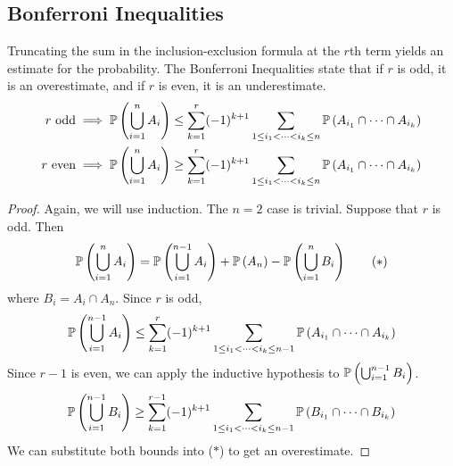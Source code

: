 \documentclass{article}
\begin{document}
\subsection{Bonferroni Inequalities}
Truncating the sum in the inclusion-exclusion formula at the $r$th term yields an estimate for the probability. The Bonferroni Inequalities state that if $r$ is odd, it is an overestimate, and if $r$ is even, it is an underestimate.
\begin{align*}
	r \text{ odd}  & \implies \mathbb{P}\left({\bigcup_{i=1}^n A_i}\right) \leq \sum_{k=1}^r (-1)^{k+1} \sum_{1 \leq i_1 < \dots < i_k \leq n} \mathbb{P}\left({A_{i_1} \cap \dots \cap A_{i_k}}\right) \\
	r \text{ even} & \implies \mathbb{P}\left({\bigcup_{i=1}^n A_i}\right) \geq \sum_{k=1}^r (-1)^{k+1} \sum_{1 \leq i_1 < \dots < i_k \leq n} \mathbb{P}\left({A_{i_1} \cap \dots \cap A_{i_k}}\right)
\end{align*}
\begin{proof}
	Again, we will use induction. The $n=2$ case is trivial. Suppose that $r$ is odd. Then
	\begin{equation}
		\mathbb{P}\left({\bigcup_{i=1}^n A_i}\right) = \mathbb{P}\left({\bigcup_{i=1}^{n-1} A_i}\right) + \mathbb{P}\left({A_n}\right) - \mathbb{P}\left({\bigcup_{i=1}^n B_i}\right) \tag{$\ast$}
	\end{equation}
	where $B_i = A_i \cap A_n$. Since $r$ is odd,
	\[ \mathbb{P}\left({\bigcup_{i=1}^{n-1} A_i}\right) \leq \sum_{k=1}^r (-1)^{k+1} \sum_{1 \leq i_1 < \dots < i_k \leq n-1} \mathbb{P}\left({A_{i_1} \cap \dots \cap A_{i_k}}\right) \]
	Since $r-1$ is even, we can apply the inductive hypothesis to $\mathbb{P}\left({\bigcup_{i=1}^{n-1} B_i}\right)$.
	\[ \mathbb{P}\left({\bigcup_{i=1}^{n-1} B_i}\right) \geq \sum_{k=1}^{r-1} (-1)^{k+1} \sum_{1 \leq i_1 < \dots < i_k \leq n-1} \mathbb{P}\left({B_{i_1} \cap \dots \cap B_{i_k}}\right) \]
	We can substitute both bounds into ($\ast$) to get an overestimate.
\end{proof}
\end{document}
